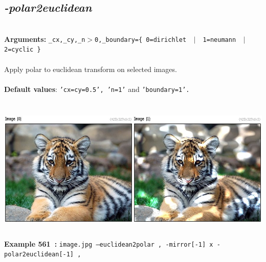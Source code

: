 \documentclass[a4paper,11pt,twoside]{book}
\begin{document}
\subsection{\emph{-polar2euclidean} }\vspace*{-0.5em}
~\\\textbf{Arguments: } 
{\small \texttt{\_cx,\_cy,\_n$>$0,\_boundary=\{ 0=dirichlet ~$|$~ 1=neumann ~$|$~ 2=cyclic \}}}\\~\\
Apply polar to euclidean transform on selected images.
~\\~\\\textbf{Default values}: {\small \texttt{'cx=cy=0.5', 'n=1'} and \texttt{'boundary=1'.}}
\begin{center}\includegraphics[keepaspectratio=true,height=7cm,width=\textwidth]{img/gmic_def561.jpg}\\
{\footnotesize \textbf{Example 561~:} \texttt{image.jpg --euclidean2polar , -mirror[-1] x -polar2euclidean[-1] ,}}
\end{center}
\end{document}
